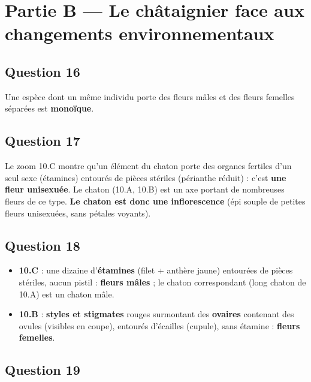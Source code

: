 \documentclass[11pt,a4paper]{article}
\providecommand{\tightlist}{\setlength{\itemsep}{0pt}\setlength{\parskip}{0pt}}
\begin{document}
\hypertarget{partie-b-le-chuxe2taignier-face-aux-changements-environnementaux}{%
\section{Partie B --- Le châtaignier face aux changements environnementaux}\label{partie-b-le-chuxe2taignier-face-aux-changements-environnementaux}}

\hypertarget{question-16}{%
\subsection{Question 16}\label{question-16}}

Une espèce dont un même individu porte des fleurs mâles et des fleurs femelles séparées est \textbf{monoïque}.

\hypertarget{question-17}{%
\subsection{Question 17}\label{question-17}}

Le zoom 10.C montre qu'un élément du chaton porte des organes fertiles d'un seul sexe (étamines) entourés de pièces stériles (périanthe réduit) : c'est \textbf{une fleur unisexuée}. Le chaton (10.A, 10.B) est un axe portant de nombreuses fleurs de ce type. \textbf{Le chaton est donc une inflorescence} (épi souple de petites fleurs unisexuées, sans pétales voyants).

\hypertarget{question-18}{%
\subsection{Question 18}\label{question-18}}

\begin{itemize}
\tightlist
\item
  \textbf{10.C} : une dizaine d'\textbf{étamines} (filet + anthère jaune) entourées de pièces stériles, aucun pistil : \textbf{fleurs mâles} ; le chaton correspondant (long chaton de 10.A) est un chaton mâle.
\item
  \textbf{10.B} : \textbf{styles et stigmates} rouges surmontant des \textbf{ovaires} contenant des ovules (visibles en coupe), entourés d'écailles (cupule), sans étamine : \textbf{fleurs femelles}.
\end{itemize}

\hypertarget{question-19}{%
\subsection{Question 19}\label{question-19}}
\end{document}

